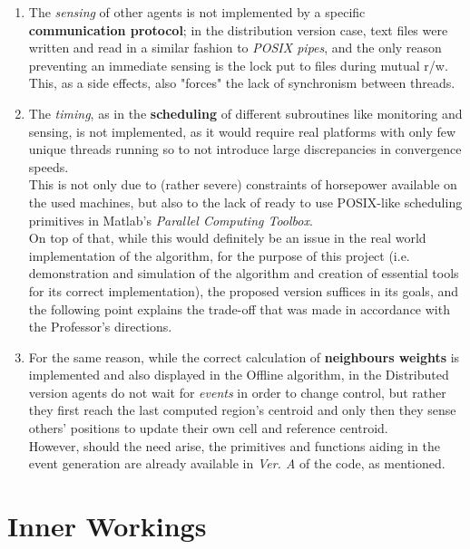\documentclass[a4paper,11pt,oneside]{book}
\begin{document}
	\begin{enumerate}
		\item The \textit{sensing} of other agents is not implemented by a specific \textbf{communication protocol}; in the distribution version case, text files were written and read in a similar fashion to \textit{POSIX pipes}, and the only reason preventing an immediate sensing is the lock put to files during mutual r/w.\\This, as a side effects, also "forces" the lack of synchronism between threads.
		
		\item The \textit{timing}, as in the \textbf{scheduling} of different subroutines like monitoring and sensing, is not implemented, as it would require real platforms with only few unique threads running so to not introduce large discrepancies in convergence speeds.\\
		This is not only due to (rather severe) constraints of horsepower available on the used machines, but also to the lack of ready to use POSIX-like scheduling primitives in Matlab's \textit{Parallel Computing Toolbox}.\\
		On top of that, while this would definitely be an issue in the real world implementation of the algorithm, for the purpose of this project (i.e. demonstration and simulation of the algorithm and creation of essential tools for its correct implementation), the proposed version suffices in its goals, and the following point explains the trade-off that was made in accordance with the Professor's directions.
		
		\item For the same reason, while the correct calculation of \textbf{neighbours weights} is implemented and also displayed in the Offline algorithm, in the Distributed version agents do not wait for \textit{events} in order to change control, but rather they first reach the last computed region's centroid and only then they sense others' positions to update their own cell and reference centroid.\\
		However, should the need arise, the primitives and functions aiding in the event generation are already available in \emph{Ver. A} of the code, as mentioned.
		
		
	\end{enumerate}


\newpage %
	
	
	
	\section{Inner Workings}
\end{document}
